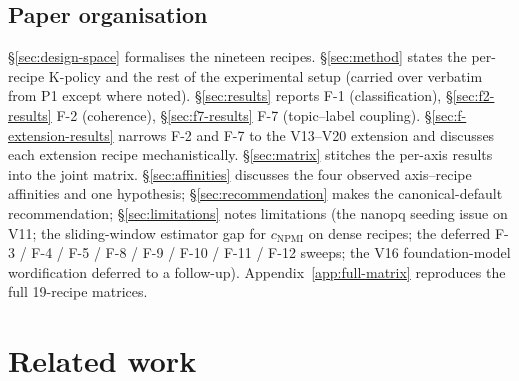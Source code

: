 \documentclass[journal,a4paper,10pt]{IEEEtran}
\begin{document}
\subsection{Paper organisation}
\S\ref{sec:design-space} formalises the nineteen recipes.
\S\ref{sec:method} states the per-recipe K-policy and the rest of the
experimental setup (carried over verbatim from P1 except where noted).
\S\ref{sec:results} reports F-1 (classification),
\S\ref{sec:f2-results} F-2 (coherence), \S\ref{sec:f7-results} F-7
(topic--label coupling). \S\ref{sec:f-extension-results} narrows
F-2 and F-7 to the V13--V20 extension and discusses each extension
recipe mechanistically. \S\ref{sec:matrix} stitches the per-axis
results into the joint matrix. \S\ref{sec:affinities} discusses the
four observed axis--recipe affinities and one hypothesis; \S\ref{sec:recommendation}
makes the canonical-default recommendation; \S\ref{sec:limitations}
notes limitations (the nanopq seeding issue on V11; the
sliding-window estimator gap for $c_{\mathrm{NPMI}}$ on dense recipes; the
deferred F-3 / F-4 / F-5 / F-8 / F-9 / F-10 / F-11 / F-12 sweeps; the
V16 foundation-model wordification deferred to a follow-up).
Appendix~\ref{app:full-matrix} reproduces the full 19-recipe matrices.

\section{Related work}\label{sec:related}
\end{document}
